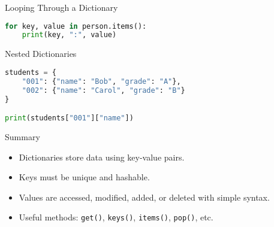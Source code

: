 \begin{frame}[fragile]{Looping Through a Dictionary}
\begin{lstlisting}[language=Python]
for key, value in person.items():
    print(key, ":", value)
\end{lstlisting}
\end{frame}

\begin{frame}[fragile]{Nested Dictionaries}
\begin{lstlisting}[language=Python]
students = {
    "001": {"name": "Bob", "grade": "A"},
    "002": {"name": "Carol", "grade": "B"}
}

print(students["001"]["name"])
\end{lstlisting}
\end{frame}

\begin{frame}{Summary}
\begin{itemize}
    \item Dictionaries store data using key-value pairs.
    \item Keys must be unique and hashable.
    \item Values are accessed, modified, added, or deleted with simple syntax.
    \item Useful methods: \texttt{get()}, \texttt{keys()}, \texttt{items()}, \texttt{pop()}, etc.
\end{itemize}
\end{frame}

